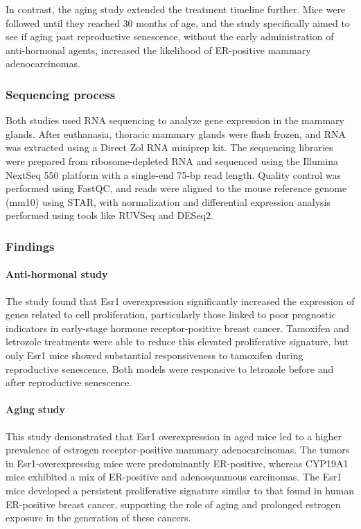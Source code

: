 In contrast, the aging study extended the treatment timeline further.
Mice were followed until they reached 30 months of age, and the study
specifically aimed to see if aging past reproductive senescence, without the
early administration of anti-hormonal agents, increased the likelihood of
ER-positive mammary adenocarcinomas.

\subsubsection{Sequencing process}
Both studies used RNA sequencing to analyze gene expression in the mammary
glands.
After euthanasia, thoracic mammary glands were flash frozen, and RNA was
extracted using a Direct Zol RNA miniprep kit.
The sequencing libraries were prepared from ribosome-depleted RNA and sequenced
using the Illumina NextSeq 550 platform with a single-end 75-bp read length.
Quality control was performed using FastQC, and reads were aligned to the mouse
reference genome (mm10) using STAR, with normalization and differential
expression analysis performed using tools like RUVSeq and DESeq2.

\subsubsection{Findings}

\paragraph{Anti-hormonal study}
The study found that Esr1 overexpression significantly increased the expression
of genes related to cell proliferation, particularly those linked to poor
prognostic indicators in early-stage hormone receptor-positive breast cancer.
Tamoxifen and letrozole treatments were able to reduce this elevated
proliferative signature, but only Esr1 mice showed substantial responsiveness
to tamoxifen during reproductive senescence.
Both models were responsive to letrozole before and after reproductive
senescence.

\paragraph{Aging study}
This study demonstrated that Esr1 overexpression in aged mice led
to a higher prevalence of estrogen receptor-positive mammary adenocarcinomas.
The tumors in Esr1-overexpressing mice were predominantly ER-positive, whereas
CYP19A1 mice exhibited a mix of ER-positive and adenosquamous carcinomas.
The Esr1 mice developed a persistent proliferative signature similar to that
found in human ER-positive breast cancer, supporting the role of aging and
prolonged estrogen exposure in the generation of these cancers.
